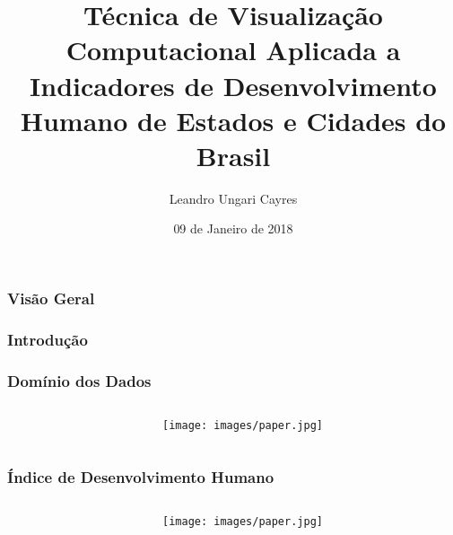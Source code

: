 \documentclass[aspectratio=169]{beamer}
\title[Projeto de Visualização]{Técnica de Visualização Computacional Aplicada a Indicadores de Desenvolvimento Humano de Estados e Cidades do Brasil}
\author[Leandro Ungari Cayres]{Leandro Ungari Cayres} %
\institute[UNESP] %
{
Universidade Estadual Paulista \\ %
\medskip
\textit{leandroungari@gmail.com} %
}
\date{09 de Janeiro de 2018} %
\begin{document}
\begin{frame}
\titlepage %
\end{frame}

\begin{frame}
\frametitle{Visão Geral}
\tableofcontents
\end{frame}

\begin{frame}
\frametitle{Introdução}
\justifying





\end{frame}

\begin{frame}
\frametitle{Domínio dos Dados}
\justifying

\begin{columns}

\begin{column}{0.5\textwidth}


\end{column}

\begin{column}{0.5\textwidth}

\begin{figure}
\centering
\texttt{[image: images/paper.jpg]}
\end{figure}


\end{column}
\end{columns}


\end{frame}

\begin{frame}
\frametitle{Índice de Desenvolvimento Humano}
\justifying

\begin{columns}

\begin{column}{0.5\textwidth}


\end{column}

\begin{column}{0.5\textwidth}

\begin{figure}
\centering
\texttt{[image: images/paper.jpg]}
\end{figure}


\end{column}
\end{columns}



\end{frame}
\end{document}
